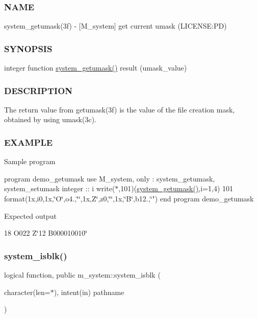\subsubsection*{N\+A\+ME}

system\+\_\+getumask(3f) -\/ \mbox{[}M\+\_\+system\mbox{]} get current umask (L\+I\+C\+E\+N\+SE\+:PD) \subsubsection*{S\+Y\+N\+O\+P\+S\+IS}

integer function \mbox{\hyperlink{namespacem__system_aa9ca951be39d2ea738d627cf42c00ddd}{system\+\_\+getumask()}} result (umask\+\_\+value) \subsubsection*{D\+E\+S\+C\+R\+I\+P\+T\+I\+ON}

The return value from getumask(3f) is the value of the file creation mask, obtained by using umask(3c). \subsubsection*{E\+X\+A\+M\+P\+LE}

Sample program

program demo\+\_\+getumask use M\+\_\+system, only \+: system\+\_\+getumask, system\+\_\+setumask integer \+:\+: i write($\ast$,101)(\mbox{\hyperlink{namespacem__system_aa9ca951be39d2ea738d627cf42c00ddd}{system\+\_\+getumask()}},i=1,4) 101 format(1x,i0,1x,\char`\"{}\+O\textquotesingle{}\char`\"{},o4.,\char`\"{}\textquotesingle{}\char`\"{},1x,\textquotesingle{}Z\char`\"{}\textquotesingle{},z0,\char`\"{}\textquotesingle{}\char`\"{},1x,\char`\"{}B\textquotesingle{}\char`\"{},b12.,\char`\"{}\textquotesingle{}") end program demo\+\_\+getumask

Expected output

18 O\textquotesingle{}022\textquotesingle{} Z\char`\"{}12\textquotesingle{} B\textquotesingle{}000010010\char`\"{} \mbox{\label{namespacem__system_a791fa587005ec07cbcd7b0045ee6f43f}} 
\subsubsection{\texorpdfstring{system\+\_\+isblk()}{system\_isblk()}}
{\footnotesize\ttfamily logical function, public m\+\_\+system\+::system\+\_\+isblk (\begin{DoxyParamCaption}\item[{character(len=$\ast$), intent(in)}]{pathname }\end{DoxyParamCaption})}



